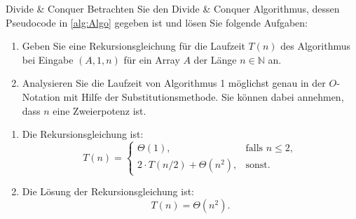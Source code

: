 \documentclass{article}
\begin{document}
\begin{exercise}{Divide \& Conquer}
  Betrachten Sie den Divide \& Conquer Algorithmus, dessen Pseudocode in \ref{alg:Algo} gegeben ist und lösen Sie folgende Aufgaben:
  \begin{enumerate}
    \item Geben Sie eine Rekursionsgleichung für die Laufzeit $T(n)$ des Algorithmus bei Eingabe $(A, 1, n)$ für ein Array $A$ der Länge $n \in \mathbb{N}$ an.
    \item Analysieren Sie die Laufzeit von Algorithmus 1 möglichst genau in der $O$-Notation mit Hilfe der Substitutionsmethode. Sie können dabei annehmen, dass $n$ eine Zweierpotenz ist.
  \end{enumerate}
  

  \begin{solution}
    \begin{enumerate}
      \item Die Rekursionsgleichung ist: \[
              T(n) = \begin{cases}
                \Theta(1),                    & \text{falls } n \leq 2, \\
                2 \cdot T(n/2) + \Theta(n^2), & \text{sonst}.
              \end{cases}
            \]
      \item Die Lösung der Rekursionsgleichung ist: \[
              T(n) = \Theta(n^2).
            \]
    \end{enumerate}
  \end{solution}
\end{exercise}
\end{document}

